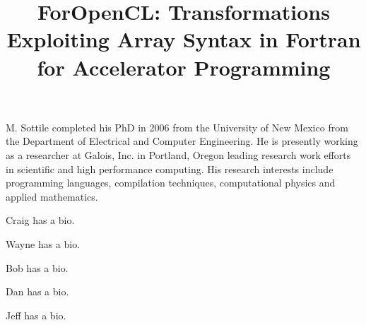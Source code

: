 \documentclass{doublecol-new}
\begin{document}


\title{ForOpenCL: Transformations Exploiting Array Syntax in Fortran for Accelerator Programming}







\begin{bio}
M. Sottile completed his PhD in 2006 from the University of New Mexico
from the Department of Electrical and Computer Engineering.  He is
presently working as a researcher at Galois, Inc. in Portland, Oregon
leading research work efforts in scientific and high performance computing.
His research interests include programming languages, compilation techniques,
computational physics and applied mathematics.

\noindent Craig has a bio.

\noindent Wayne has a bio.

\noindent Bob has a bio.

\noindent Dan has a bio.

\noindent Jeff has a bio.
\end{bio}
\end{document}
